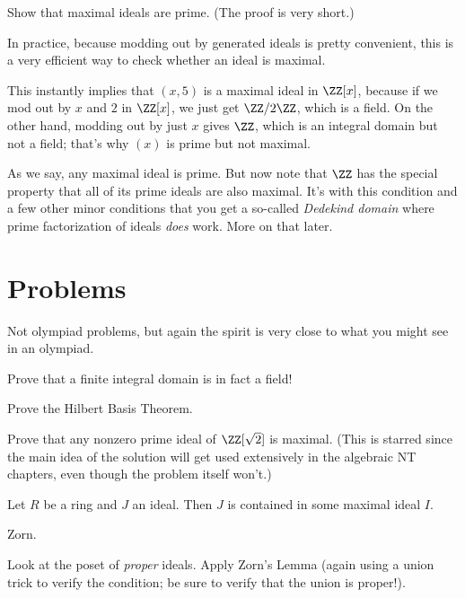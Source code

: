 \begin{ques}
	Show that maximal ideals are prime.
	(The proof is very short.)
\end{ques}

In practice, because modding out by generated ideals is pretty convenient,
this is a very efficient way to check whether an ideal is maximal.
\begin{example}
	\listhack
	\begin{enumerate}[(a)]
		\ii This instantly implies that $(x,5)$ is a maximal ideal
		in $\ZZ[x]$, because if we mod out by $x$ and $2$ in $\ZZ[x]$,
		we just get $\ZZ/2\ZZ$, which is a field.
		\ii On the other hand, modding out by just $x$ gives $\ZZ$,
		which is an integral domain but not a field; that's why $(x)$ is
		prime but not maximal.
	\end{enumerate}
\end{example}

As we say, any maximal ideal is prime.
But now note that $\ZZ$ has the special property that
all of its prime ideals are also maximal.
It's with this condition and a few other minor conditions
that you get a so-called \emph{Dedekind domain}
where prime factorization of ideals \emph{does} work.
More on that later.

\section{Problems}
Not olympiad problems, but again the spirit is very close
to what you might see in an olympiad.

\begin{sproblem}
	Prove that a finite integral domain is in fact a field!
	\label{prob:finite_domain_field}
\end{sproblem}
\begin{problem}
	Prove the Hilbert Basis Theorem.
\end{problem}
\begin{sproblem}
	Prove that any nonzero prime ideal of $\ZZ[\sqrt 2]$ is maximal.
	(This is starred since the main idea of the solution will get used extensively in
	the algebraic NT chapters, even though the problem itself won't.)
	\label{prob:dedekind_sample}
\end{sproblem}

\begin{problem}
	Let $R$ be a ring and $J$ an ideal.
	Then $J$ is contained in some maximal ideal $I$.
	\begin{hint}
		Zorn.
	\end{hint}
	\begin{sol}
		Look at the poset of \emph{proper} ideals.
		Apply Zorn's Lemma (again using a union trick to verify the condition;
		be sure to verify that the union is proper!).
	\end{sol}
\end{problem}

